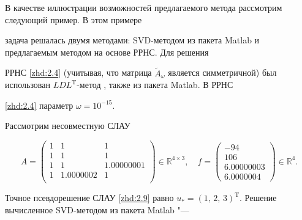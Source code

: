В качестве иллюстрации возможностей предлагаемого метода рассмотрим следующий пример. В этом примере

задача решалась двумя методами: SVD-методом из пакета Matlab и предлагаемым методом на основе РРНС. Для решения

РРНС \eqref{zhd:2.4} (учитывая, что матрица $\tilde A_\omega$ является симметричной) был использован $LDL^\mathrm{T}$-метод \cite{zhdanov:Tref}, также из пакета Matlab. В РРНС

\eqref{zhd:2.4} параметр $\omega=10^{-15}$.



Рассмотрим несовместную СЛАУ

\begin{equation}\label{zhd:2.9}

    A=\left(

        \begin{array}{ccc}

          1 & 1 & 1 \\

          1 & 1 & 1 \\

          1 & 1 & 1.00000001 \\

          1 & 1.0000002 & 1 \\

        \end{array}

      \right)\in\mathbb{R}^{4\times3}, \quad f=\left(

                         \begin{array}{c}

                           -94 \\

                           106 \\

                           6.00000003 \\

                           6.0000004

                         \end{array}

                       \right)\in\mathbb{R}^4.

\end{equation}



Точное псевдорешение СЛАУ \eqref{zhd:2.9} равно $u_*=(1,\, 2,\, 3)^\mathrm{T}$. Решение вычисленное SVD-методом из пакета Matlab "---

